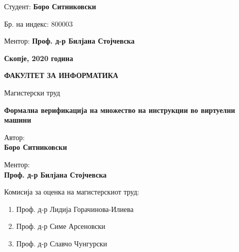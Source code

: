 \vspace{5em}

Студент: \textbf{Боро Ситниковски}

Бр. на индекс: 800003

\bigbreak

Ментор: \textbf{Проф. д-р Билјана Стојчевска}

\begin{center}

\vspace*{\fill}

\textbf{Скопје, 2020 година}

\newpage{}

\textbf{ФАКУЛТЕТ ЗА ИНФОРМАТИКА}

\end{center}

\vspace{5em}

Магистерски труд

\textbf{Формална верификација на множество на инструкции во виртуелни машини}

\vspace{10em}

Автор: \\ \indent \textbf{Боро Ситниковски}

Ментор: \\ \indent \textbf{Проф. д-р Билјана Стојчевска}

\vspace*{\fill}

Комисија за оценка на магистерскиот труд:

\begin{enumerate}
\def\labelenumi{\arabic{enumi}.}
\item
  Проф. д-р Лидија Горачинова-Илиева
\item
  Проф. д-р Симе Арсеновски
\item
  Проф. д-р Славчо Чунгурски
\end{enumerate}

\newpage{}


